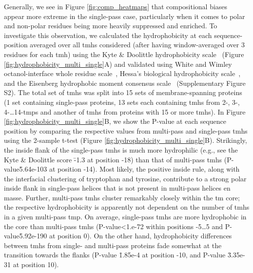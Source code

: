 Generally, we see in Figure \ref{fig:comp_heatmaps} that compositional biases appear more extreme in the single-pass case, particularly when it comes to polar and non-polar residues being more heavily suppressed and enriched. To investigate this observation, we calculated the hydrophobicity at each sequence-position averaged over all \gls{tmh}s considered (after having window-averaged over 3 residues for each \gls{tmh}) using the Kyte \& Doolittle hydrophobicity scale~\cite{Kyte1982} (Figure \ref{fig:hydrophobicity_multi_single}A) and validated using White and Wimley octanol-interface whole residue scale~\cite{White1999}, Hessa’s biological hydrophobicity scale~\cite{Hessa2005}, and the Eisenberg hydrophobic moment consensus scale~\cite{Eisenberg1984} (Supplementary Figure S2). The total set of \gls{tmh}s was split into 15 sets of membrane-spanning proteins (1 set containing single-pass proteins, 13 sets each containing \gls{tmh}s from 2-, 3-, 4-\ldots 14-\gls{tmp}s and another of \gls{tmh}s from proteins with 15 or more \gls{tmh}s). In Figure \ref{fig:hydrophobicity_multi_single}B, we show the P-value at each sequence position by comparing the respective values from multi-pass and single-pass \gls{tmh}s using the 2-sample t-test (Figure \ref{fig:hydrophobicity_multi_single}B). Strikingly, the inside flank of the single-pass \gls{tmh}s is much more hydrophilic (e.g., see the Kyte \& Doolittle score \= -1.3 at position -18) than that of multi-pass \gls{tmh}s (P-value\=5.64e-103 at position -14). Most likely, the positive inside rule, along with the interfacial clustering of tryptophan and tyrosine, contribute to a strong polar inside flank in single-pass helices that is not present in multi-pass helices en masse. Further, multi-pass \gls{tmh}s cluster remarkably closely within the \gls{tm} core; the respective hydrophobicity is apparently not dependent on the number of \gls{tmh}s in a given multi-pass \gls{tmp}. On average, single-pass \gls{tmh}s are more hydrophobic in the core than multi-pass \gls{tmh}s (P-value<1.e-72 within positions -5…5 and P-value\=5.92e-190 at position 0). On the other hand, hydrophobicity differences between \gls{tmh}s from single- and multi-pass proteins fade somewhat at the transition towards the flanks (P-value \= 1.85e-4 at position -10, and P-value \= 3.35e-31 at position 10).

